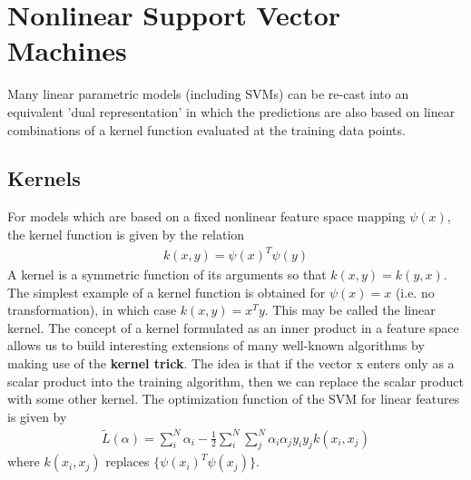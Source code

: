 \documentclass[main]{subfiles}
\begin{document}

\section{Nonlinear Support Vector Machines}
Many linear parametric models (including SVMs) can be  re-cast into an equivalent 'dual representation' in which the predictions are also based on linear combinations of a kernel function evaluated at the training data points. 
\subsection{Kernels}
For models which are based on a fixed nonlinear feature space mapping $\psi(x)$, the kernel function is given by the relation
\begin{align}
k(x,y)=\psi(x)^T\psi(y)
\end{align}
A kernel is a symmetric function of its arguments so that $k(x,y)=k(y,x)$. The simplest example of a kernel function is obtained for $\psi(x)=x$ (i.e. no transformation), in which case $k(x,y)=x^Ty$. This may be called the linear kernel. The concept of a kernel formulated as an inner product in a feature space allows us to build interesting extensions of many well-known algorithms by making use of the \textbf{kernel trick}. The idea is that if the vector x enters only as a scalar product into the training algorithm, then we can replace the scalar product with some other kernel. \newline
The optimization function of the SVM for linear features is given by 
\begin{align}
\tilde{L}(\alpha)=\sum_i^N \alpha_i - \frac{1}{2} \sum_i^N \sum_j^N \alpha_i \alpha_j y_i y_j k(x_i, x_j)
\end{align}
where $k(x_i, x_j)$ replaces $\{\psi(x_i)^T \psi(x_j)\}$.
\end{document}
